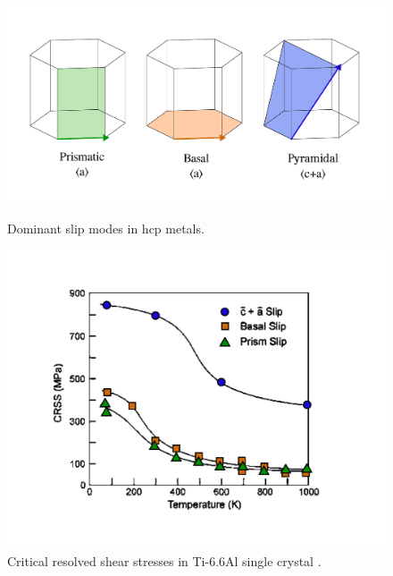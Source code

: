 \begin{figure}[h!]
\centering
  \includegraphics[width=\textwidth]{Figures/slip_systems.pdf}
  \caption{Dominant slip modes in hcp metals.\label{fig.hcp-deformation}}
  \includegraphics[width=\textwidth]{Figures/CRSS_plot.pdf}
  \caption{Critical resolved shear stresses in Ti-6.6Al single crystal \cite{lütjering2013titanium}.\label{fig.CRSS} }
\end{figure}

